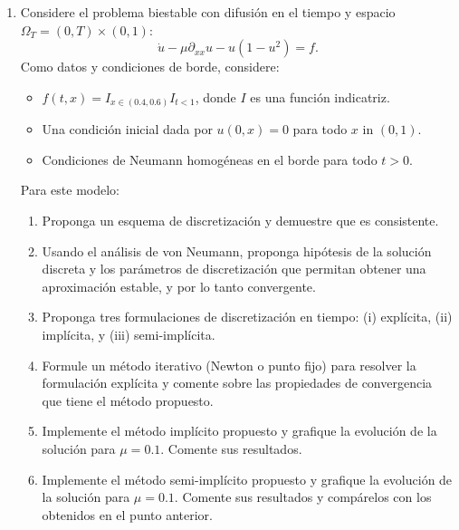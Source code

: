 \documentclass{article}
\newcommand{\pts}[1]{[{\bf #1 puntos}] }
\begin{document}
\begin{enumerate}
    \item Considere el problema biestable con difusión en el tiempo y espacio $\Omega_T = (0,T)\times (0,1)$:
            $$ \dot u - \mu \partial_{xx} u - u(1-u^2) = f. $$
            Como datos y condiciones de borde, considere:
            \begin{itemize}
                \item $f(t,x) = I_{x\in (0.4,0.6)}I_{t<1}$, donde $I$ es una función indicatriz.
                \item Una condición inicial dada por $u(0,x) = 0$ para todo $x$ in $(0,1)$. 
                \item Condiciones de Neumann homogéneas en el borde para todo $t>0$. 
            \end{itemize}
            Para este modelo:
            \begin{enumerate}
                \item\pts{1} Proponga un esquema de discretización y demuestre que es consistente.
                \item\pts{1} Usando el análisis de von Neumann, proponga hipótesis de la solución discreta y los parámetros de discretización que permitan obtener una aproximación estable, y por lo tanto convergente.
                \item\pts{1} Proponga tres formulaciones de discretización en tiempo: (i) explícita, (ii) implícita, y (iii) semi-implícita. 
                \item\pts{1} Formule un método iterativo (Newton o punto fijo) para resolver la formulación explícita y comente sobre las propiedades de convergencia que tiene el método propuesto. 
                \item\pts{3} Implemente el método implícito propuesto y grafique la evolución de la solución para $\mu=0.1$. Comente sus resultados.
                \item\pts{2} Implemente el método semi-implícito propuesto y grafique la evolución de la solución para $\mu=0.1$. Comente sus resultados y compárelos con los obtenidos en el punto anterior.
            \end{enumerate}


\end{enumerate}
\end{document}
